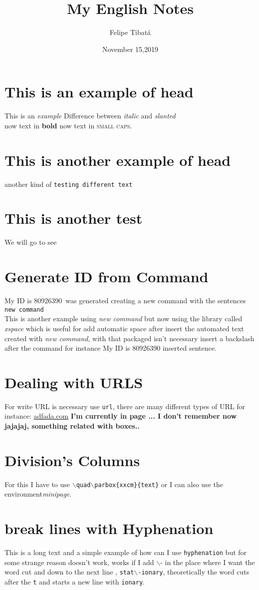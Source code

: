 \documentclass{book}
\begin{document}
	\newcommand{\cedula}{My ID is 80926390\xspace}
	\title{My English Notes}
	\author{Felipe Tibatá}
	\date{November 15,2019}
	\maketitle
\section{This is an example of head}
This is an \emph{example}
Difference between \textit{italic} and \textsl{slanted}\\
now text in \textbf{bold}
now text in \textsc{small caps}.

\section{\textsf{This is another example of head}}
another kind of \texttt{testing different text}

\section{\sffamily This is another test}
We will go to see

\section{Generate ID from Command}
\cedula\ was generated creating a new command with the sentences  \texttt{new command}\\
This is another example using \textit{new command} but now using the library called \textit{xspace}
which is useful for add automatic space after insert the automated text created with 
\textit{new command}, with that packaged isn't necessary insert a backslash after the command
for instance \cedula inserted sentence.

\section{Dealing with URLS}
For write URL is necessary use \texttt{url}, there are many different types of URL for instance:
\url{adfada.com}
\textbf{I'm currently in page ... I don't remember now jajajaj, something related with boxes..}

\section{Division's Columns}
For this I have to use \texttt{$\backslash$quad$\backslash$parbox\{xxcm\}\{text\}} or I can also use the \mbox{environment}\textit{minipage}.

\section{break lines with Hyphenation}
This is a long text and a simple example of how can I use \texttt{hyphenation} but for some strange reason doesn't work, works if I add $\backslash$- in the place where I want the word cut and down to the next line , \texttt{stat$\backslash$-ionary}, theoretically the word cuts after the \texttt{t}  and starts a new line with \texttt{ionary}.
\end{document}
